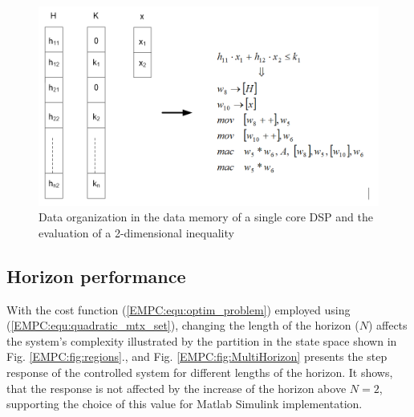 
    \begin{figure}[!ht]
        \centering
        \includegraphics[width=\textwidth]{EMPC_PNG_Pics/Memory.png}
        \caption{Data organization in the data memory of a single core DSP and the evaluation of a 2-dimensional inequality}
        \label{EMPC:fig:Memory}
    \end{figure}

    \subsection{Horizon performance}\label{EMPC:sec:Performance}

    With the cost function (\ref{EMPC:equ:optim_problem}) employed using (\ref{EMPC:equ:quadratic_mtx_set}), changing the length of the horizon ($N$) affects the system's complexity illustrated by the partition in the state space shown in Fig. \ref{EMPC:fig:regions}., and Fig. \ref{EMPC:fig:MultiHorizon} presents the step response of the controlled system for different lengths of the horizon. It shows, that the response is not affected by the increase of the horizon above $N=2$, supporting the choice of this value for Matlab Simulink implementation.

